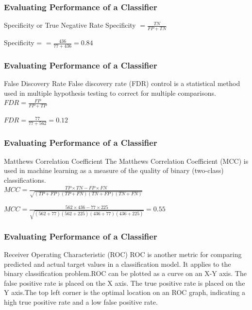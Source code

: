 \documentclass[serif,11pt,aspectratio=1610,table]{beamer}
\begin{document}
\begin{frame}
 \frametitle{Evaluating Performance of a Classifier}
 \begin{block}{Specificity or True Negative Rate}
  Specificity $= \frac{TN}{FP + TN}$
 \end{block}
 \vspace{.5cm}
 Specificity = $ = \frac{436}{77 + 436} = 0.84$

\end{frame}

\begin{frame}
 \frametitle{Evaluating Performance of a Classifier}
 \begin{block}{False Discovery Rate}
  False discovery rate (FDR) control is a statistical method used in multiple hypothesis testing to correct for multiple comparisons.\\
  \vspace{.5cm}
  $FDR = \frac{FP}{FP+TP}$
 \end{block}
\vspace{.5cm}
$FDR = \frac{77}{77+562} = 0.12$
\end{frame}


\begin{frame}
 \frametitle{Evaluating Performance of a Classifier}
\begin{block}{Matthews Correlation Coefficient}
The Matthews Correlation Coefficient (MCC) is used in machine learning as a measure of the quality of binary (two-class) classifications.\\
\vspace{.5cm}
$MCC = \frac{TP \times TN - FP \times FN}{\sqrt {(TP+FP) (TP+FN) (TN+FP) (TN+FN)}}$
\end{block}
\vspace{.5cm}
$MCC =\frac{562 \times 436 - 77 \times 225}{\sqrt{(562+77)(562+225)(436+77)(436+225)}} = 0.55$
\end{frame}

\begin{frame}
 \frametitle{Evaluating Performance of a Classifier}
\begin{block}{Receiver Operating Characteristic (ROC)}
 ROC is another metric for comparing predicted and actual target values in a classification model. It applies to the binary classification problem.ROC can be plotted as a curve on an X-Y axis. The false positive rate is placed on the X axis. The true positive rate is placed on the Y axis.The top left corner is the optimal location on an ROC graph, indicating a high true positive rate and a low false positive rate.
\end{block}

\end{frame}
\end{document}
